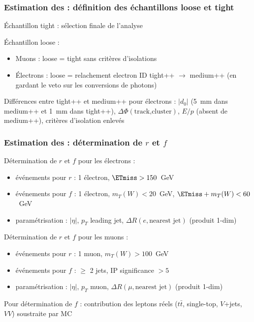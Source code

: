 \begin{frame}
\frametitle{Estimation des  : définition des échantillons loose et tight}
\begin{maliste}
\item \'Echantillon tight : sélection finale de l'analyse
\item \'Echantillon loose : 
\begin{itemize}
\item Muons : loose = tight sans critères d'isolations
\item \'Electrons : loose = relachement electron ID tight++ $\rightarrow$ medium++ (en gardant le veto sur les conversions de photons)
\end{itemize}
\item Différences entre tight++ et medium++ pour électrons : $|d_0|$ (5~mm dans medium++ et 1~mm dans tight++), $\Delta\Phi(\text{track,cluster})$, $E/p$ (absent de medium++), critères d'isolation enlevés

\end{maliste}
\end{frame}

\begin{frame}
\frametitle{Estimation des  : détermination de $r$ et $f$}
\begin{maliste}
\item Détermination de $r$ et $f$ pour les électrons : 
\begin{itemize}
\item événements pour $r$ : 1 électron, $\ETmiss>150$~GeV
\item événements pour $f$ : 1 électron, $m_T(W)<20$~GeV, $\ETmiss+m_T(W) < 60$~GeV
\item paramétrisation : $|\eta|$, $p_T$ leading jet, $\Delta R(e,\text{nearest jet})$ (produit 1-dim)
\end{itemize}
\item Détermination de $r$ et $f$ pour les muons :
\begin{itemize}
\item événements pour $r$ : 1 muon, $m_T(W)>100$~GeV
\item événements pour $f$ : $\geq$ 2 jets, IP significance $>5$ 
\item paramétrisation : $|\eta|$, $p_T$ muon, $\Delta R(\mu,\text{nearest jet})$ (produit 1-dim)
\end{itemize}
\item Pour détermination de $f$ : contribution des leptons réels ($t\bar{t}$, single-top, $V$+jets, $VV$) soustraite par MC
\end{maliste}
\end{frame}

